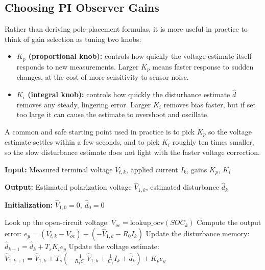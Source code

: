 \subsection{Choosing PI Observer Gains}
Rather than deriving pole-placement formulas, it is more useful in practice to think of gain selection as tuning two knobs:
\begin{itemize}
    \item \textbf{$K_p$ (proportional knob):} controls how quickly the voltage estimate itself responds to new measurements. Larger $K_p$ means faster response to sudden changes, at the cost of more sensitivity to sensor noise.
    \item \textbf{$K_i$ (integral knob):} controls how quickly the disturbance estimate $\hat d$ removes any steady, lingering error. Larger $K_i$ removes bias faster, but if set too large it can cause the estimate to overshoot and oscillate.
\end{itemize}
A common and safe starting point used in practice is to pick $K_p$ so the voltage estimate settles within a few seconds, and to pick $K_i$ roughly ten times smaller, so the slow disturbance estimate does not fight with the faster voltage correction.

\begin{algorithm}[htbp]

\caption{Proportional-Integral Observer for Parameter Disturbance}
\label{alg:pi_observer}

\footnotesize

\begin{algorithmic}[1]

\State \textbf{Input:} Measured terminal voltage $V_{t,k}$, applied current $I_k$, gains $K_p$, $K_i$

\State \textbf{Output:} Estimated polarization voltage $\hat{V}_{1,k}$, estimated disturbance $\hat{d}_k$

\State \textbf{Initialization:} $\hat{V}_{1,0}=0,\ \hat{d}_0=0$

    \State Look up the open-circuit voltage: $V_{oc} = \mathrm{lookup\_ocv}(SOC_k)$
    \State Compute the output error: $e_y = (V_{t,k}-V_{oc}) - (-\hat{V}_{1,k}-R_0I_k)$
    \State Update the disturbance memory: $\hat{d}_{k+1} = \hat{d}_k + T_s K_i e_y$
    \State Update the voltage estimate:
    \State $\hat{V}_{1,k+1} = \hat{V}_{1,k} + T_s\left(-\frac{1}{R_1C_1}\hat{V}_{1,k} + \frac{1}{C_1}I_k + \hat{d}_k\right) + K_p e_y$
\EndFor

\end{algorithmic}

\end{algorithm}

